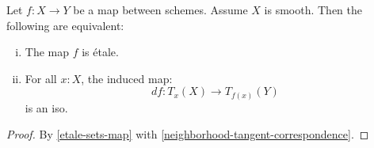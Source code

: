 \begin{corollary}
Let $f:X\to Y$ be a map between schemes. Assume $X$ is smooth. Then the following are equivalent:
\begin{enumerate}[(i)]
\item The map $f$ is étale. 
\item For all $x:X$, the induced map:
\[df : T_x(X)\to T_{f(x)}(Y)\]
is an iso.
\end{enumerate}
\end{corollary}

\begin{proof}
By \cref{etale-sets-map}  with \cref{neighborhood-tangent-correspondence}.
\end{proof}
